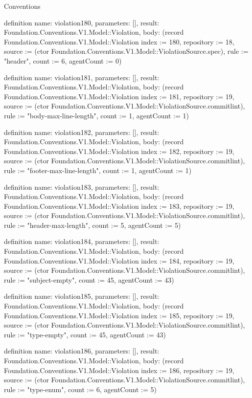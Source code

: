 \begin{lexlean}{Conventions}
\begin{semanticmodule}
definition{
  name: violation180,
  parameters: [],
  result: Foundation.Conventions.V1.Model::Violation,
  body: (record Foundation.Conventions.V1.Model::Violation {index := 180, repository := 18, source := (ctor Foundation.Conventions.V1.Model::ViolationSource.spec), rule := "header", count := 6, agentCount := 0})
}

definition{
  name: violation181,
  parameters: [],
  result: Foundation.Conventions.V1.Model::Violation,
  body: (record Foundation.Conventions.V1.Model::Violation {index := 181, repository := 19, source := (ctor Foundation.Conventions.V1.Model::ViolationSource.commitlint), rule := "body-max-line-length", count := 1, agentCount := 1})
}

definition{
  name: violation182,
  parameters: [],
  result: Foundation.Conventions.V1.Model::Violation,
  body: (record Foundation.Conventions.V1.Model::Violation {index := 182, repository := 19, source := (ctor Foundation.Conventions.V1.Model::ViolationSource.commitlint), rule := "footer-max-line-length", count := 1, agentCount := 1})
}

definition{
  name: violation183,
  parameters: [],
  result: Foundation.Conventions.V1.Model::Violation,
  body: (record Foundation.Conventions.V1.Model::Violation {index := 183, repository := 19, source := (ctor Foundation.Conventions.V1.Model::ViolationSource.commitlint), rule := "header-max-length", count := 5, agentCount := 5})
}

definition{
  name: violation184,
  parameters: [],
  result: Foundation.Conventions.V1.Model::Violation,
  body: (record Foundation.Conventions.V1.Model::Violation {index := 184, repository := 19, source := (ctor Foundation.Conventions.V1.Model::ViolationSource.commitlint), rule := "subject-empty", count := 45, agentCount := 43})
}

definition{
  name: violation185,
  parameters: [],
  result: Foundation.Conventions.V1.Model::Violation,
  body: (record Foundation.Conventions.V1.Model::Violation {index := 185, repository := 19, source := (ctor Foundation.Conventions.V1.Model::ViolationSource.commitlint), rule := "type-empty", count := 45, agentCount := 43})
}

definition{
  name: violation186,
  parameters: [],
  result: Foundation.Conventions.V1.Model::Violation,
  body: (record Foundation.Conventions.V1.Model::Violation {index := 186, repository := 19, source := (ctor Foundation.Conventions.V1.Model::ViolationSource.commitlint), rule := "type-enum", count := 6, agentCount := 5})
}


\end{semanticmodule}
\end{lexlean}
